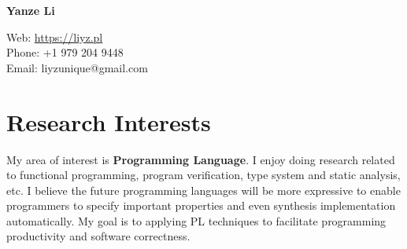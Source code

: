\documentclass[12pt,letterpaper]{report}
\newcommand{\myname}{Yanze Li}
\newcommand{\namefont}[1]{{\normalfont\bfseries\Huge{#1}}}
\newcommand{\listitemspace}{0.15em}
\renewenvironment{itemize}
{\begin{list}{}{\setlength{\leftmargin}{0em}
			\setlength{\parskip}{0em}
			\setlength{\itemsep}{\listitemspace}
			\setlength{\parsep}{\listitemspace}}}
	{\end{list}}
\begin{document}
	\raggedright
	
	\namefont{\myname}
	
	\vspace{1em}
	\begin{minipage}[t]{0.495\textwidth}
		Web: \href{https://liyz.pl}{https://liyz.pl} \\		
		Phone: +1 979 204 9448\\
		Email: liyzunique@gmail.com
	\end{minipage}
	\vspace{0.5em}
	

	
	\section*{Research Interests}
	
	\begin{itemize}
		\item My area of interest is \textbf{Programming Language}.
		I enjoy doing research related to functional programming, program verification, type system and static analysis, etc.
		I believe the future programming languages will be more expressive to enable programmers to specify important properties and even synthesis implementation automatically. My goal is to applying PL techniques to facilitate programming productivity and software correctness.

	\end{itemize}
\end{document}
